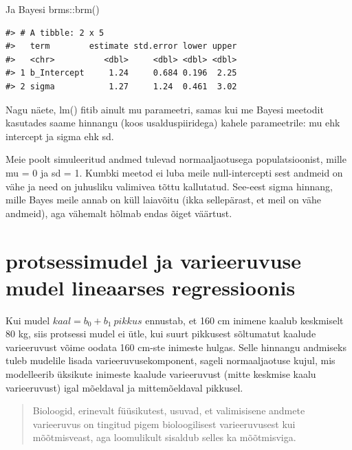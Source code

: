 \documentclass[]{book}
\newenvironment{Shaded}{\begin{snugshade}}{\end{snugshade}}
\newcommand{\KeywordTok}[1]{\textcolor[rgb]{0.13,0.29,0.53}{\textbf{#1}}}
\newcommand{\DataTypeTok}[1]{\textcolor[rgb]{0.13,0.29,0.53}{#1}}
\newcommand{\DecValTok}[1]{\textcolor[rgb]{0.00,0.00,0.81}{#1}}
\newcommand{\StringTok}[1]{\textcolor[rgb]{0.31,0.60,0.02}{#1}}
\newcommand{\OperatorTok}[1]{\textcolor[rgb]{0.81,0.36,0.00}{\textbf{#1}}}
\newcommand{\NormalTok}[1]{#1}
\begin{document}
Ja Bayesi brms::brm()

\begin{Shaded}
\end{Shaded}

\begin{verbatim}
#> # A tibble: 2 x 5
#>   term        estimate std.error lower upper
#>   <chr>          <dbl>     <dbl> <dbl> <dbl>
#> 1 b_Intercept     1.24     0.684 0.196  2.25
#> 2 sigma           1.27     1.24  0.461  3.02
\end{verbatim}

Nagu näete, lm() fitib ainult mu parameetri, samas kui me Bayesi
meetodit kasutades saame hinnangu (koos usalduspiiridega) kahele
parameetrile: mu ehk intercept ja sigma ehk sd.

Meie poolt simuleeritud andmed tulevad normaaljaotusega populatsioonist,
mille mu = 0 ja sd = 1. Kumbki meetod ei luba meile null-intercepti sest
andmeid on vähe ja need on juhusliku valimivea tõttu kallutatud.
See-eest sigma hinnang, mille Bayes meile annab on küll laiavõitu (ikka
sellepärast, et meil on vähe andmeid), aga vähemalt hõlmab endas õiget
väärtust.

\section{protsessimudel ja varieeruvuse mudel lineaarses
regressioonis}\label{protsessimudel-ja-varieeruvuse-mudel-lineaarses-regressioonis}

Kui mudel \(kaal = b_0 + b_1 ~pikkus\) ennustab, et 160 cm inimene
kaalub keskmiselt 80 kg, siis protsessi mudel ei ütle, kui suurt
pikkusest sõltumatut kaalude varieeruvust võime oodata 160 cm-ste
inimeste hulgas. Selle hinnangu andmiseks tuleb mudelile lisada
varieeruvusekomponent, sageli normaaljaotuse kujul, mis modelleerib
üksikute inimeste kaalude varieeruvust (mitte keskmise kaalu
varieeruvust) igal mõeldaval ja mittemõeldaval pikkusel.

\begin{quote}
Bioloogid, erinevalt füüsikutest, usuvad, et valimisisene andmete
varieeruvus on tingitud pigem bioloogilisest varieeruvusest kui
mõõtmisveast, aga loomulikult sisaldub selles ka mõõtmisviga.
\end{quote}
\end{document}
